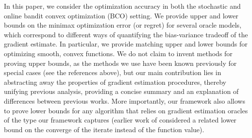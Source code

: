 
In this paper, we consider the optimization accuracy in both the stochastic and online bandit convex optimization (BCO) setting.
We  provide upper and lower bounds on the minimax optimization error (or regret) for several oracle models, which correspond to different ways of quantifying the bias-variance tradeoff of the gradient estimate. In particular, we provide matching upper and lower bounds for optimizing smooth, convex functions. We do not claim to invent methods for proving upper bounds, as the methods we use have been known previously for special cases  (see the references above),
but our main contribution lies in abstracting away the properties of gradient estimation procedures, 
thereby unifying previous analysis, providing a concise summary and an explanation of differences between previous works.
More importantly, our framework also allows to prove lower bounds for any algorithm that relies on gradient
estimation oracles of the type our framework captures
(earlier work of \citealp{Chen88:LB-AoS} considered a related lower bound on the converge of the iterate instead of the function value).

